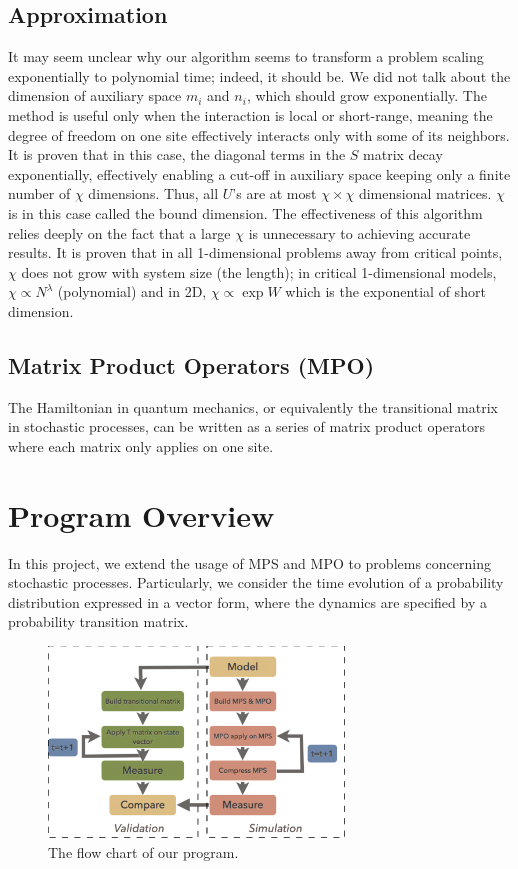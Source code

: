 \documentclass[english]{article}
\begin{document}
\subsection{Approximation}

It may seem unclear why our algorithm seems to transform a
 problem scaling exponentially to polynomial time; indeed, it should be.
We did not talk about the dimension of auxiliary space $m_{i}$ and
$n_{i}$, which should grow exponentially. The method is useful
only when the interaction is local or short-range, meaning the
degree of freedom on one site  effectively interacts only with some
of its neighbors. It is proven that in this case, the diagonal terms
in the $S$ matrix decay exponentially, effectively enabling a cut-off
in auxiliary space keeping only a finite number of $\chi$ dimensions. Thus, all $U$'s are at most $\chi\times\chi$ dimensional matrices.
$\chi$ is in this case called the bound dimension. The effectiveness of this algorithm
relies deeply on the fact that a large $\chi$ is unnecessary to achieving accurate
results. It is proven that in all 1-dimensional problems away from critical
points, $\chi$ does not grow with system size (the length); in critical
1-dimensional models, $\chi\propto N^{\lambda}$ (polynomial) and
in 2D, $\chi\propto\exp W$ which is the exponential of short dimension.


\subsection{Matrix Product Operators (MPO)}
The Hamiltonian in quantum mechanics, or equivalently the transitional matrix in stochastic processes, can be written as a series of matrix product operators where each matrix only applies on one site.

\section{Program Overview}
In this project, we extend the usage of MPS and MPO to problems concerning stochastic processes. Particularly, we  consider the time evolution of a probability distribution expressed in a vector form, where the dynamics are specified by a probability transition matrix.

\begin{figure}[htbp]
\begin{center}
\includegraphics[width=0.7\textwidth]{flow_chart_new.pdf}
\caption{The flow chart of our program.}
\label{fig:flow_chart}
\end{center}
\end{figure}
\end{document}
